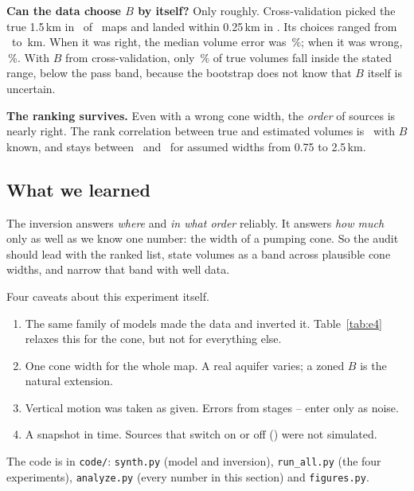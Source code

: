 \textbf{Can the data choose $B$ by itself?} Only roughly. Cross-validation picked the true 1.5\,km in
\cvBexact\ of \nScen\ maps and landed within 0.25\,km in \cvBnear. Its choices ranged from \cvBmin\ to
\cvBmax\,km. When it was right, the median volume error was \cvGoodErr\,\%; when it was wrong,
\cvBadErr\,\%. With $B$ from cross-validation, only \cvCover\,\% of true volumes fall inside the
stated range, below the pass band, because the bootstrap does not know that $B$ itself is uncertain.

\textbf{The ranking survives.} Even with a wrong cone width, the \emph{order} of sources is nearly
right. The rank correlation between true and estimated volumes is \rankCal\ with $B$ known, and
stays between \rankWide\ and \rankOneK\ for assumed widths from 0.75 to 2.5\,km.

\subsection{What we learned}

\begin{plain}
The inversion answers \emph{where} and \emph{in what order} reliably. It answers \emph{how much} only as
well as we know one number: the width of a pumping cone. So the audit should lead with the ranked
list, state volumes as a band across plausible cone widths, and narrow that band with well data.
\end{plain}

Four caveats about this experiment itself.
\begin{enumerate}
\item The same family of models made the data and inverted it. Table~\ref{tab:e4} relaxes this for
the cone, but not for everything else.
\item One cone width for the whole map. A real aquifer varies; a zoned $B$ is the natural extension.
\item Vertical motion was taken as given. Errors from stages -- enter only as noise.
\item A snapshot in time. Sources that switch on or off () were not simulated.
\end{enumerate}

The code is in \texttt{code/}: \texttt{synth.py} (model and inversion), \texttt{run\_all.py} (the four
experiments), \texttt{analyze.py} (every number in this section) and \texttt{figures.py}.

